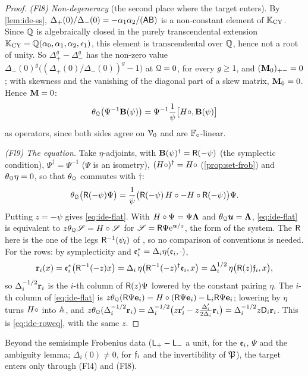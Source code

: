 \begin{proof}
\emph{(Fl8) Non-degeneracy} (the second place where the target enters). By \cref{lem:ide-ss}, $\Delta_+(0)/\Delta_-(0)=-\alpha_1\alpha_2/(\mathsf{A}\mathsf{B})$ is a non-constant element of $\mathbb{K}_{\mathrm{CY}}$. Since $\mathbb{Q}$ is algebraically closed in the purely transcendental extension $\mathbb{K}_{\mathrm{CY}}=\mathbb{Q}(\alpha_0,\alpha_1,\alpha_2,\epsilon_1)$, this element is transcendental over $\mathbb{Q}$, hence not a root of unity. So $\Delta_+^g-\Delta_-^g$ has the non-zero value $\Delta_-(0)^g\big((\Delta_+(0)/\Delta_-(0))^g-1\big)$ at $\mathcal{Q}=0$, for every $g\geq 1$, and $(\mathbf{M}_0)_{+-}=0$; with skewness and the vanishing of the diagonal part of a skew matrix, $\mathbf{M}_0=0$. Hence $\mathbf{M}=0$:
\[
\theta_{\mathcal{Q}}\big(\Psi^{-1}\mathbf{B}(\psi)\big)=\Psi^{-1}\frac1\psi\big[H\circ,\mathbf{B}(\psi)\big]
\]
as operators, since both sides agree on $\mathcal{V}_0$ and are $\mathbb{F}_{\circ}$-linear.

\emph{(Fl9) The equation.} Take $\eta$-adjoints, with $\mathbf{B}(\psi)^\dagger=\mathsf{R}(-\psi)$ (the symplectic condition), $\Psi^\dagger=\Psi^{-1}$ ($\Psi$ is an isometry), $(H\circ)^\dagger=H\circ$ (\cref{prop:set-frob}) and $\theta_{\mathcal{Q}}\eta=0$, so that $\theta_{\mathcal{Q}}$ commutes with $\dagger$:
\[
\theta_{\mathcal{Q}}\big(\mathsf{R}(-\psi)\Psi\big)=\frac1\psi\big(\mathsf{R}(-\psi)\,H\circ-H\circ\mathsf{R}(-\psi)\big)\Psi .
\]
Putting $z=-\psi$ gives \cref{eq:ide-flat}. With $H\circ\Psi=\Psi\boldsymbol{\Lambda}$ and $\theta_{\mathcal{Q}}\boldsymbol{u}=\boldsymbol{\Lambda}$, \cref{eq:ide-flat} is equivalent to $z\theta_{\mathcal{Q}}\mathscr{S}=H\circ\mathscr{S}$ for $\mathscr{S}=\mathsf{R}\Psi\mathrm{e}^{\boldsymbol{u}/z}$, the form \cite[Section~1.3, (3)--(5)]{Giv01} of the system. The $\mathsf{R}$ here is the one of the legs $\mathsf{R}^{-1}(\psi_l)$ of \cite[Def.~2.2]{PPZ15}, so no comparison of conventions is needed. For the rows: by symplecticity and $\mathfrak{e}_i^*=\Delta_i\eta(\mathfrak{e}_i,\cdot)$,
\[
\mathbf{r}_i(x)=\mathfrak{e}_i^*\big(\mathsf{R}^{-1}(-z)x\big)=\Delta_i\,\eta\big(\mathsf{R}^{-1}(-z)^\dagger\mathfrak{e}_i,x\big)=\Delta_i^{1/2}\,\eta\big(\mathsf{R}(z)\mathfrak{f}_i,x\big),
\]
so $\Delta_i^{-1/2}\mathbf{r}_i$ is the $i$-th column of $\mathsf{R}(z)\Psi$ lowered by the constant pairing $\eta$. The $i$-th column of \cref{eq:ide-flat} is $z\theta_{\mathcal{Q}}(\mathsf{R}\Psi\mathbf{e}_i)=H\circ(\mathsf{R}\Psi\mathbf{e}_i)-\mathsf{L}_i\mathsf{R}\Psi\mathbf{e}_i$; lowering by $\eta$ turns $H\circ$ into $\mathbb{A}$, and $z\theta_{\mathcal{Q}}(\Delta_i^{-1/2}\mathbf{r}_i)=\Delta_i^{-1/2}\big(z\mathbf{r}_i'-z\frac{\Delta_i'}{2\Delta_i}\mathbf{r}_i\big)=\Delta_i^{-1/2}z\mathsf{D}_i\mathbf{r}_i$. This is \cref{eq:ide-roweq}, with the same $z$.
\end{proof}

Beyond the semisimple Frobenius data ($\mathsf{L}_+-\mathsf{L}_-$ a unit, for the $\mathfrak{e}_i$, $\Psi$ and the ambiguity lemma; $\Delta_i(0)\neq 0$, for $\mathfrak{f}_i$ and the invertibility of $\mathfrak{P}$), the target enters only through (Fl4) and (Fl8).

